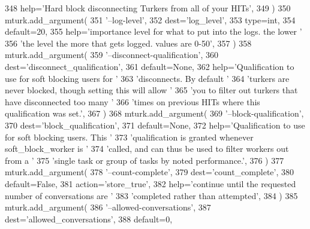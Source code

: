 \begin{DoxyCode}
348             help=\textcolor{stringliteral}{'Hard block disconnecting Turkers from all of your HITs'},
349         )
350         mturk.add\_argument(
351             \textcolor{stringliteral}{'--log-level'},
352             dest=\textcolor{stringliteral}{'log\_level'},
353             type=int,
354             default=20,
355             help=\textcolor{stringliteral}{'importance level for what to put into the logs. the lower '}
356             \textcolor{stringliteral}{'the level the more that gets logged. values are 0-50'},
357         )
358         mturk.add\_argument(
359             \textcolor{stringliteral}{'--disconnect-qualification'},
360             dest=\textcolor{stringliteral}{'disconnect\_qualification'},
361             default=\textcolor{keywordtype}{None},
362             help=\textcolor{stringliteral}{'Qualification to use for soft blocking users for '}
363             \textcolor{stringliteral}{'disconnects. By default '}
364             \textcolor{stringliteral}{'turkers are never blocked, though setting this will allow '}
365             \textcolor{stringliteral}{'you to filter out turkers that have disconnected too many '}
366             \textcolor{stringliteral}{'times on previous HITs where this qualification was set.'},
367         )
368         mturk.add\_argument(
369             \textcolor{stringliteral}{'--block-qualification'},
370             dest=\textcolor{stringliteral}{'block\_qualification'},
371             default=\textcolor{keywordtype}{None},
372             help=\textcolor{stringliteral}{'Qualification to use for soft blocking users. This '}
373             \textcolor{stringliteral}{'qualification is granted whenever soft\_block\_worker is '}
374             \textcolor{stringliteral}{'called, and can thus be used to filter workers out from a '}
375             \textcolor{stringliteral}{'single task or group of tasks by noted performance.'},
376         )
377         mturk.add\_argument(
378             \textcolor{stringliteral}{'--count-complete'},
379             dest=\textcolor{stringliteral}{'count\_complete'},
380             default=\textcolor{keyword}{False},
381             action=\textcolor{stringliteral}{'store\_true'},
382             help=\textcolor{stringliteral}{'continue until the requested number of conversations are '}
383             \textcolor{stringliteral}{'completed rather than attempted'},
384         )
385         mturk.add\_argument(
386             \textcolor{stringliteral}{'--allowed-conversations'},
387             dest=\textcolor{stringliteral}{'allowed\_conversations'},
388             default=0,

\end{DoxyCode}
